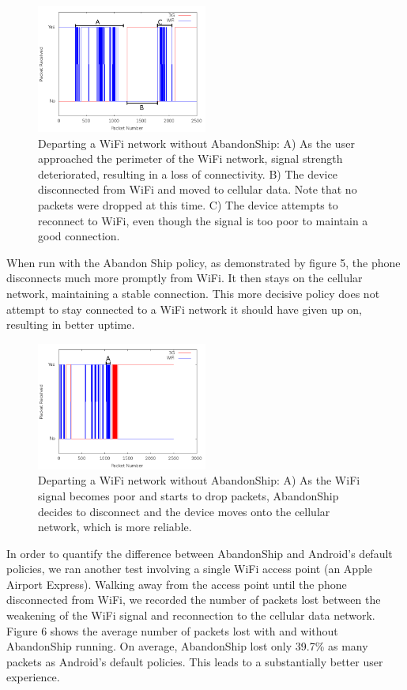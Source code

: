 \begin{figure}
	\includegraphics[width=0.5\textwidth]{leavingCourtyardsNoPolicy}
	\caption{Departing a WiFi network without AbandonShip: A) As the user approached the perimeter of the WiFi network, signal strength deteriorated, resulting in a loss of connectivity. B) The device disconnected from WiFi and moved to cellular data. Note that no packets were dropped at this time. C) The device attempts to reconnect to WiFi, even though the signal is too poor to maintain a good connection.}
\end{figure}

When run with the Abandon Ship policy, as demonstrated by figure 5, the phone disconnects much more promptly from WiFi. It then stays on the cellular network, maintaining a stable connection. This more decisive policy does not attempt to stay connected to a WiFi network it should have given up on, resulting in better uptime.

\begin{figure}
	\includegraphics[width=0.5\textwidth]{leavingCourtyardsWithPolicy}
	\caption{Departing a WiFi network without AbandonShip: A) As the WiFi signal becomes poor and starts to drop packets, AbandonShip decides to disconnect and the device moves onto the cellular network, which is more reliable.}
\end{figure}

In order to quantify the difference between AbandonShip and Android's default policies, we ran another test involving a single WiFi access point (an Apple Airport Express). Walking away from the access point until the phone disconnected from WiFi, we recorded the number of packets lost between the weakening of the WiFi signal and reconnection to the cellular data network. Figure 6 shows the average number of packets lost with and without AbandonShip running. On average, AbandonShip lost only 39.7\% as many packets as Android's default policies. This leads to a substantially better user experience.

